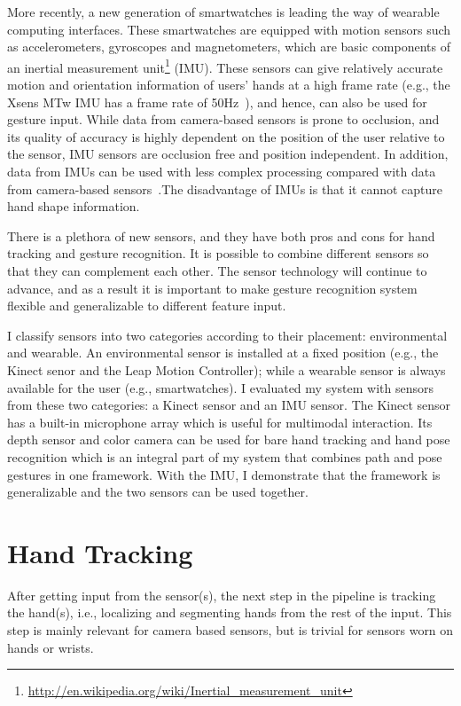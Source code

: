 More recently, a new generation of smartwatches is leading the way of wearable
computing interfaces.
These smartwatches are equipped with motion sensors such as
accelerometers, gyroscopes and magnetometers, which are basic components of an
inertial measurement
unit\footnote{\url{http://en.wikipedia.org/wiki/Inertial_measurement_unit}}
(IMU). These sensors can give relatively accurate motion and orientation
information of users' hands at a high frame rate (e.g., the Xsens MTw IMU has
a frame rate of 50Hz~\cite{Ruffieux2013}), and hence, can also be used for gesture input.
While data from camera-based sensors is prone to occlusion, and its quality
of accuracy is highly dependent on the position of the user relative to the
sensor, IMU sensors are occlusion free and position independent. In
addition, data from IMUs can be used with less complex processing
compared with data from camera-based sensors~\cite{Ruffieux2013}.The
disadvantage of IMUs is that it cannot capture hand shape information.

There is a plethora of new sensors, and they have both pros and cons for hand
tracking and gesture recognition. It is possible to combine different sensors
so that they can complement each other. The sensor technology will continue to
advance, and as a result it is important to make gesture recognition system
 flexible and generalizable to different feature input. 

I classify
sensors into two categories according to their placement:
environmental and wearable. An environmental sensor is installed at a fixed
position (e.g., the Kinect senor and the Leap Motion Controller); while a
wearable sensor is always available for the user (e.g., smartwatches). I
evaluated my system with sensors from these two categories: a Kinect sensor and
an IMU sensor.
The Kinect sensor has a built-in microphone array which is
useful for multimodal interaction. Its depth sensor and color camera can be used
for bare hand tracking and hand pose recognition which is an integral part of
my system that combines path and pose gestures in one framework. With the IMU,
I demonstrate that the framework is generalizable and the two sensors can be used together.

\section{Hand Tracking}
After getting input from the sensor(s), the next step in the pipeline is
tracking the hand(s), i.e., localizing and segmenting hands from the rest of
the input. This step is mainly relevant for camera based sensors, but is trivial
for sensors worn on hands or wrists. 

